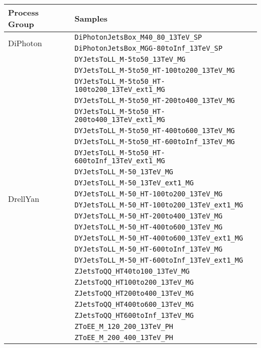 \begin{longtable}{ll}
\toprule
Process Group & Samples \\
\midrule
\multirow{2}{*}{DiPhoton} & \texttt{DiPhotonJetsBox\_M40\_80\_13TeV\_SP} \\
 & \texttt{DiPhotonJetsBox\_MGG-80toInf\_13TeV\_SP} \\
\midrule
\multirow{40}{*}{DrellYan} & \texttt{DYJetsToLL\_M-5to50\_13TeV\_MG} \\
 & \texttt{DYJetsToLL\_M-5to50\_HT-100to200\_13TeV\_MG} \\
 & \texttt{DYJetsToLL\_M-5to50\_HT-100to200\_13TeV\_ext1\_MG} \\
 & \texttt{DYJetsToLL\_M-5to50\_HT-200to400\_13TeV\_MG} \\
 & \texttt{DYJetsToLL\_M-5to50\_HT-200to400\_13TeV\_ext1\_MG} \\
 & \texttt{DYJetsToLL\_M-5to50\_HT-400to600\_13TeV\_MG} \\
 & \texttt{DYJetsToLL\_M-5to50\_HT-600toInf\_13TeV\_MG} \\
 & \texttt{DYJetsToLL\_M-5to50\_HT-600toInf\_13TeV\_ext1\_MG} \\
 & \texttt{DYJetsToLL\_M-50\_13TeV\_MG} \\
 & \texttt{DYJetsToLL\_M-50\_13TeV\_ext1\_MG} \\
 & \texttt{DYJetsToLL\_M-50\_HT-100to200\_13TeV\_MG} \\
 & \texttt{DYJetsToLL\_M-50\_HT-100to200\_13TeV\_ext1\_MG} \\
 & \texttt{DYJetsToLL\_M-50\_HT-200to400\_13TeV\_MG} \\
 & \texttt{DYJetsToLL\_M-50\_HT-400to600\_13TeV\_MG} \\
 & \texttt{DYJetsToLL\_M-50\_HT-400to600\_13TeV\_ext1\_MG} \\
 & \texttt{DYJetsToLL\_M-50\_HT-600toInf\_13TeV\_MG} \\
 & \texttt{DYJetsToLL\_M-50\_HT-600toInf\_13TeV\_ext1\_MG} \\
 & \texttt{ZJetsToQQ\_HT40to100\_13TeV\_MG} \\
 & \texttt{ZJetsToQQ\_HT100to200\_13TeV\_MG} \\
 & \texttt{ZJetsToQQ\_HT200to400\_13TeV\_MG} \\
 & \texttt{ZJetsToQQ\_HT400to600\_13TeV\_MG} \\
 & \texttt{ZJetsToQQ\_HT600toInf\_13TeV\_MG} \\
 & \texttt{ZToEE\_M\_120\_200\_13TeV\_PH} \\
 & \texttt{ZToEE\_M\_200\_400\_13TeV\_PH} \\

\end{longtable}
